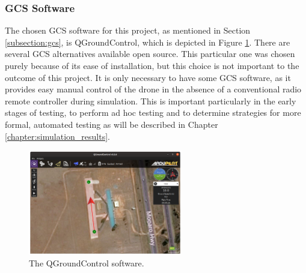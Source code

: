 \subsubsection{\gls{GCS} Software}

The chosen \gls{GCS} software for this project, as mentioned in Section \ref{subsection:gcs}, is QGroundControl, which is depicted in Figure \ref{fig:qgroundcontrol}. There are several \gls{GCS} alternatives available open source. This particular one was chosen purely because of its ease of installation, but this choice is not important to the outcome of this project. It is only necessary to have some \gls{GCS} software, as it provides easy manual control of the drone in the absence of a conventional radio remote controller during simulation. This is important particularly in the early stages of testing, to perform ad hoc testing and to determine strategies for more formal, automated testing as will be described in Chapter \ref{chapter:simulation_results}.

\begin{figure}[ht]
    \centering
    \includegraphics[width=0.6\textwidth]{images/qgroundcontrol.png}
    \caption{The QGroundControl software.}
    \label{fig:qgroundcontrol}
\end{figure}

